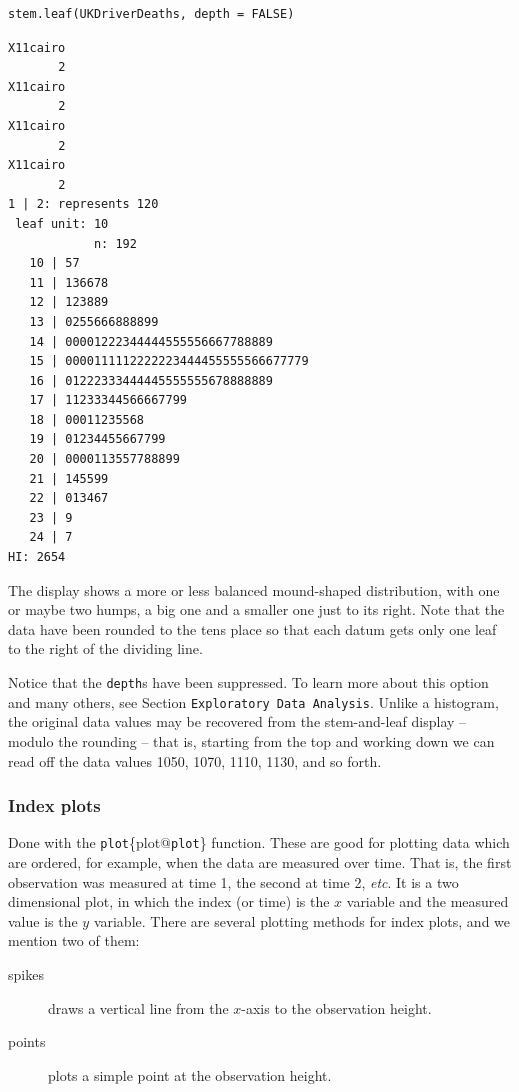 \documentclass[10pt,english]{scrbook}
\begin{document}
\begin{verbatim}
stem.leaf(UKDriverDeaths, depth = FALSE)
\end{verbatim}

\begin{verbatim}
X11cairo 
       2
X11cairo 
       2
X11cairo 
       2
X11cairo 
       2
1 | 2: represents 120
 leaf unit: 10
            n: 192
   10 | 57
   11 | 136678
   12 | 123889
   13 | 0255666888899
   14 | 00001222344444555556667788889
   15 | 0000111112222223444455555566677779
   16 | 01222333444445555555678888889
   17 | 11233344566667799
   18 | 00011235568
   19 | 01234455667799
   20 | 0000113557788899
   21 | 145599
   22 | 013467
   23 | 9
   24 | 7
HI: 2654
\end{verbatim}

The display shows a more or less balanced mound-shaped distribution, with one or maybe two humps, a big one and a smaller one just to its right. Note that the data have been rounded to the tens place so that each datum gets only one leaf to the right of the dividing line.

Notice that the \texttt{depth}s have been suppressed. To learn more about this option and many others, see Section \texttt{Exploratory Data Analysis}. Unlike a histogram, the original data values may be recovered from the stem-and-leaf display -- modulo the rounding -- that is, starting from the top and working down we can read off the data values 1050, 1070, 1110, 1130, and so forth. 
\subsubsection[Index plots]{Index plots}
\label{sec-1-1-2-4}

Done with the \texttt{plot}\index\{plot@\texttt{plot}\} function. These are good for plotting data which are ordered, for example, when the data are measured over time. That is, the first observation was measured at time 1, the second at time 2, \emph{etc}. It is a two dimensional plot, in which the index (or time) is the \(x\) variable and the measured value is the \(y\) variable. There are several plotting methods for index plots, and we mention two of them:

\begin{description}
\item[spikes] draws a vertical line from the \(x\)-axis to the observation height.
\item[points] plots a simple point at the observation height.
\end{description}
\end{document}
